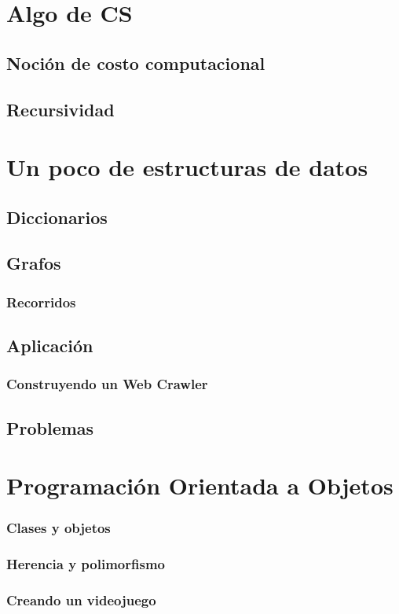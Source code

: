 \chapter{Algo de CS}
\section{Noción de costo computacional}
\section{Recursividad}

\chapter{Un poco de estructuras de datos}
\section{Diccionarios}
\section{Grafos}
\subsection{Recorridos}
\section{Aplicación}
\subsection{Construyendo un Web Crawler}
\section{Problemas}

\chapter{Programación Orientada a Objetos}
\subsection{Clases y objetos}
\subsection{Herencia y polimorfismo}
\subsection{Creando un videojuego}
